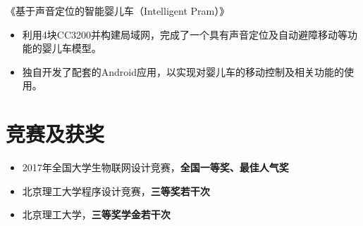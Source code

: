 \documentclass{resume}
\begin{document}
《基于声音定位的智能婴儿车（Intelligent Pram）》
\begin{itemize}
  \item 利用4块CC3200并构建局域网，完成了一个具有声音定位及自动避障移动等功能的婴儿车模型。
  \item 独自开发了配套的Android应用，以实现对婴儿车的移动控制及相关功能的使用。
\end{itemize}


\section{竞赛及获奖}
\begin{itemize}
  \item 2017年全国大学生物联网设计竞赛，\textbf{全国一等奖、最佳人气奖}
  \item 北京理工大学程序设计竞赛，\textbf{三等奖若干次}
  \item 北京理工大学，\textbf{三等奖学金若干次}
\end{itemize}



\end{document}

